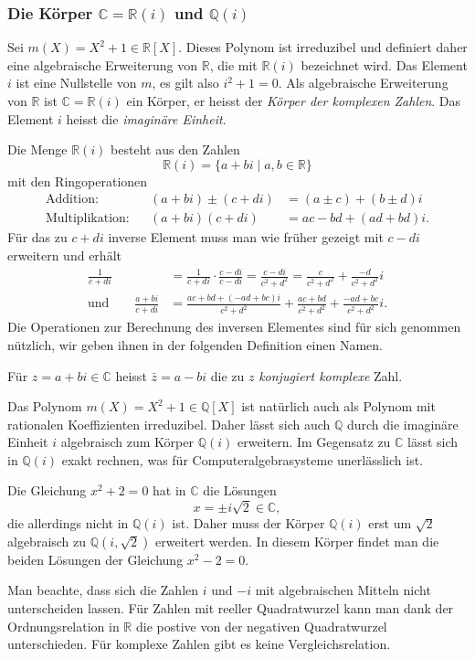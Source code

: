 %
%
\subsubsection{Die Körper $\mathbb{C}=\mathbb{R}(i)$ und $\mathbb{Q}(i)$}
Sei $m(X) = X^2 + 1 \in\mathbb{R}[X]$.
Dieses Polynom ist irreduzibel und definiert daher eine algebraische
Erweiterung von $\mathbb{R}$, die mit $\mathbb{R}(i)$ bezeichnet wird.
Das Element $i$ ist eine Nullstelle von $m$, es gilt also $i^2+1=0$.
Als algebraische Erweiterung von $\mathbb{R}$ ist $\mathbb{C}=\mathbb{R}(i)$ ein
Körper, er heisst der \emph{Körper der komplexen Zahlen}.
%
%
Das Element $i$ heisst die \emph{imaginäre Einheit}.
%
%

Die Menge $\mathbb{R}(i)$ besteht aus den Zahlen
\[
\mathbb{R}(i)
=
\{
a+bi
\mid
a,b\in\mathbb{R}
\}
\]
mit den Ringoperationen
\begin{align*}
\text{Addition:}&&
(a+bi) \pm (c+di)
&=
(a\pm c) + (b\pm d)i
\\
\text{Multiplikation:}&&
(a+bi)(c+di)
&=
ac-bd + (ad+bd)i.
\end{align*}
Für das zu $c+di$ inverse Element muss man wie früher gezeigt
mit $c-di$ erweitern und erhält
\begin{align*}
\frac{1}{c+di}
&=
\frac{1}{c+di}\cdot\frac{c-di}{c-di}
=
\frac{c-di}{c^2+d^2}
=
\frac{c}{c^2+d^2}
+
\frac{-d}{c^2+d^2}i
\\
\text{und}
\qquad
\frac{a+bi}{c+di}
&=
\frac{ac+bd + (-ad+bc)i}{c^2+d^2}
+
\frac{ac+bd}{c^2+d^2}
+
\frac{-ad+bc}{c^2+d^2}i
.
\end{align*}
Die Operationen zur Berechnung des inversen Elementes sind 
für sich genommen nützlich, wir geben ihnen in der folgenden
Definition einen Namen.

\begin{definition}
Für $z=a+bi\in\mathbb{C}$ heisst
$\bar z = a-bi$ die zu $z$ \emph{konjugiert komplexe} Zahl.
%
\end{definition}

Das Polynom $m(X)=X^2+1\in\mathbb{Q}[X]$ ist natürlich auch als
Polynom mit rationalen Koeffizienten irreduzibel.
Daher lässt sich auch $\mathbb{Q}$ durch die imaginäre Einheit
$i$ algebraisch zum Körper $\mathbb{Q}(i)$ erweitern.
Im Gegensatz zu $\mathbb{C}$ lässt sich in $\mathbb{Q}(i)$
exakt rechnen, was für Computeralgebrasysteme unerlässlich ist.

Die Gleichung $x^2+2=0$ hat in $\mathbb{C}$ die Lösungen
\[
x=
\pm
i
\!\sqrt{2}
\in\mathbb{C},
\]
die allerdings nicht in $\mathbb{Q}(i)$ ist.
Daher muss der Körper $\mathbb{Q}(i)$ erst um $\!\sqrt{2}$ 
algebraisch zu $\mathbb{Q}(i,\!\sqrt{2})$ erweitert werden.
In diesem Körper findet man die beiden Lösungen der Gleichung $x^2-2=0$.

Man beachte, dass sich die Zahlen $i$ und $-i$ mit algebraischen
Mitteln nicht unterscheiden lassen.
Für Zahlen mit reeller Quadratwurzel kann man dank der Ordnungsrelation
in $\mathbb{R}$ die postive von der negativen Quadratwurzel unterschieden.
Für komplexe Zahlen gibt es keine Vergleichsrelation.

